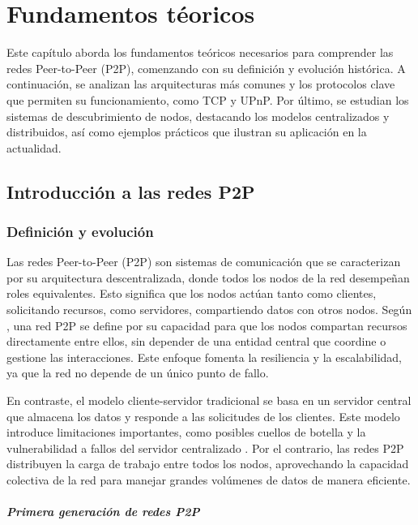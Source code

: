 \chapter{Fundamentos t\'eoricos}
\label{cap:fundamentosTeoricos}

Este capítulo aborda los fundamentos teóricos necesarios para comprender las redes Peer-to-Peer (P2P), comenzando con su definición y evolución histórica.
A continuación, se analizan las arquitecturas más comunes y los protocolos clave que permiten su funcionamiento, como TCP y UPnP.
Por último, se estudian los sistemas de descubrimiento de nodos, destacando los modelos centralizados y distribuidos, así como ejemplos prácticos que ilustran su aplicación en la actualidad.

\section{Introducción a las redes P2P}
\subsection{Definición y evolución}
Las redes Peer-to-Peer (P2P) son sistemas de comunicación que se caracterizan por su arquitectura descentralizada, donde todos los nodos de la red desempeñan roles equivalentes.
Esto significa que los nodos actúan tanto como clientes, solicitando recursos, como servidores, compartiendo datos con otros nodos.
Según \cite{schollmeier2001}, una red P2P se define por su capacidad para que los nodos compartan recursos directamente entre ellos, sin depender de una entidad central que coordine o gestione las interacciones.
Este enfoque fomenta la resiliencia y la escalabilidad, ya que la red no depende de un único punto de fallo.

En contraste, el modelo cliente-servidor tradicional se basa en un servidor central que almacena los datos y responde a las solicitudes de los clientes.
Este modelo introduce limitaciones importantes, como posibles cuellos de botella y la vulnerabilidad a fallos del servidor centralizado \cite{coulouris2011}.
Por el contrario, las redes P2P distribuyen la carga de trabajo entre todos los nodos, aprovechando la capacidad colectiva de la red para manejar grandes volúmenes de datos de manera eficiente.

\paragraph{Primera generación de redes P2P}

